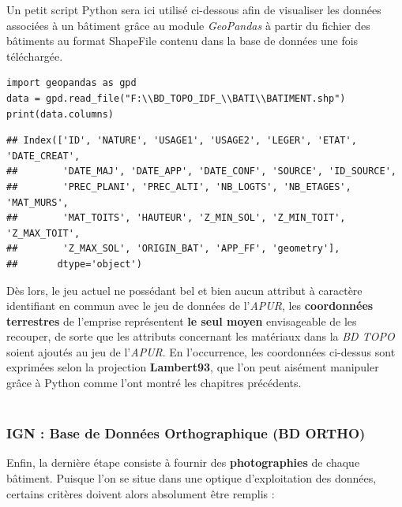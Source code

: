 \documentclass[
  11pt,
  french,
]{article}
\begin{document}
Un petit script Python sera ici utilisé ci-dessous afin de visualiser
les données associées à un bâtiment grâce au module \emph{GeoPandas} à
partir du fichier des bâtiments au format ShapeFile contenu dans la base
de données une fois téléchargée.

\begin{tcolorbox}[title= Lecture des attributs du bâti de la BD TOPO ,colback=boitecode]
\begin{lstlisting}[style=code]
import geopandas as gpd
data = gpd.read_file("F:\\BD_TOPO_IDF_\\BATI\\BATIMENT.shp")
print(data.columns)\end{lstlisting}
\begin{lstlisting}[style=out]
## Index(['ID', 'NATURE', 'USAGE1', 'USAGE2', 'LEGER', 'ETAT', 'DATE_CREAT',
##        'DATE_MAJ', 'DATE_APP', 'DATE_CONF', 'SOURCE', 'ID_SOURCE',
##        'PREC_PLANI', 'PREC_ALTI', 'NB_LOGTS', 'NB_ETAGES', 'MAT_MURS',
##        'MAT_TOITS', 'HAUTEUR', 'Z_MIN_SOL', 'Z_MIN_TOIT', 'Z_MAX_TOIT',
##        'Z_MAX_SOL', 'ORIGIN_BAT', 'APP_FF', 'geometry'],
##       dtype='object')
\end{lstlisting}
\end{tcolorbox}

Dès lors, le jeu actuel ne possédant bel et bien aucun attribut à
caractère identifiant en commun avec le jeu de données de l'\emph{APUR},
les \textbf{coordonnées terrestres} de l'emprise représentent \textbf{le
seul moyen} envisageable de les recouper, de sorte que les attributs
concernant les matériaux dans la \emph{BD TOPO} soient ajoutés au jeu de
l'\emph{APUR}. En l'occurrence, les coordonnées ci-dessus sont exprimées
selon la projection \textbf{Lambert93}, que l'on peut aisément manipuler
grâce à Python comme l'ont montré les chapitres précédents.\\
~\\

\newpage

\hypertarget{ign-base-de-donnuxe9es-orthographique-bd-ortho}{%
\subsubsection{IGN : Base de Données Orthographique (BD
ORTHO)}\label{ign-base-de-donnuxe9es-orthographique-bd-ortho}}

Enfin, la dernière étape consiste à fournir des \textbf{photographies}
de chaque bâtiment. Puisque l'on se situe dans une optique
d'exploitation des données, certains critères doivent alors absolument
être remplis :
\end{document}
